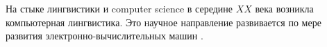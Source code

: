 \documentclass[main]{subfiles}
\begin{document}
На стыке лингвистики и computer science в середине $XX$ века возникла компьютерная лингвистика. Это научное направление развивается по мере развития электронно-вычислительных машин \cite{ches}.
\end{document}
